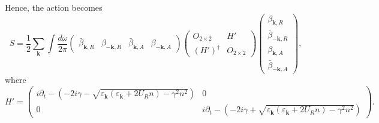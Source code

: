 \documentclass[aps,onecolumn,superscriptaddress,notitlepage,longbibliography]{revtex4-1}
\newcommand{\tmmathbf}[1]{\ensuremath{\boldsymbol{#1}}}
\begin{document}
Hence, the action becomes
\begin{equation}
  S = \frac{1}{2} \sum_{\tmmathbf{k}} \int \frac{d \omega}{2 \pi}
  \left(\begin{array}{cccc}
    \bar{\beta}_{\tmmathbf{k}, R} & \beta_{- \tmmathbf{k}, R} &
    \bar{\beta}_{\tmmathbf{k}, A} & \beta_{- \tmmathbf{k}, A}
  \end{array}\right) \left(\begin{array}{cc}
    O_{2 \times 2} & H'\\
    (H')^{\dagger} & O_{2 \times 2}
  \end{array}\right) \left(\begin{array}{c}
    \beta_{\tmmathbf{k}, R}\\
    \bar{\beta}_{- \tmmathbf{k}, R}\\
    \beta_{\tmmathbf{k}, A}\\
    \bar{\beta}_{- \tmmathbf{k}, A}
  \end{array}\right),
\end{equation}
where
\begin{equation}
  H' = \left(\begin{array}{cc}
    i \partial_t - \left( - 2 i \gamma - \sqrt{\varepsilon_{\tmmathbf{k}}
    (\varepsilon_{\tmmathbf{k}} + 2 U_R n) - \gamma^2 n^2} \right) & 0\\
    0 & i \partial_t - \left( - 2 i \gamma + \sqrt{\varepsilon_{\tmmathbf{k}}
    (\varepsilon_{\tmmathbf{k}} + 2 U_R n) - \gamma^2 n^2} \right)
  \end{array}\right) .
\end{equation}


\
\end{document}
